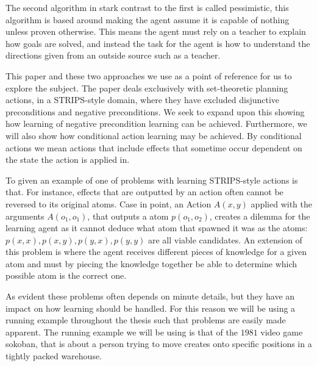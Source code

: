 \documentclass[Master.tex]{subfiles}
\begin{document}
	The second algorithm in stark contrast to the first is called pessimistic, this algorithm is based around making the agent assume it is capable of nothing unless proven otherwise. This means the agent must rely on a teacher to explain how goals are solved, and instead the task for the agent is how to understand the directions given from an outside source such as a teacher.
	
	This paper and these two approaches we use as a point of reference for us to explore the subject.  The paper deals exclusively with set-theoretic planning actions, in a STRIPS-style domain, where they have excluded disjunctive preconditions and negative preconditions. 
	We seek to expand upon this showing how learning of negative precondition learning can be achieved. Furthermore, we will also show how conditional action learning may be achieved. By conditional actions we mean actions that include effects that sometime occur dependent on the state the action is applied in.
	
	
	To given an example of one of problems with learning STRIPS-style actions is that. For instance, effects that are outputted by an action often cannot be reversed to its original atoms. Case in point, an Action $A(x,y)$ applied with the arguments $A(o_1,o_1)$, that outputs a atom $p(o_1,o_2)$, creates a dilemma for the learning agent as it cannot deduce what atom that spawned it was as the atoms: $p(x,x), p(x,y), p(y,x), p(y,y)$ are all viable candidates. An extension of this problem is where the agent receives different pieces of knowledge for a given atom and must by piecing the knowledge together be able to determine which possible atom is the correct one.
	
	As evident these problems often depends on minute details, but they have an impact on how learning should be handled. For this reason we will be using a running example throughout the thesis such that problems are easily made apparent. The running example we will be using is that of the $1981$ video game sokoban, that is about a person trying to move creates onto specific positions in a tightly packed warehouse.
	
\end{document}
